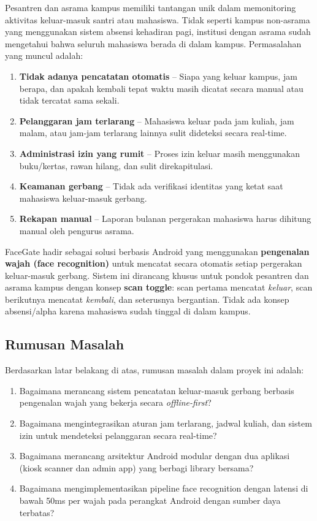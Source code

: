 \documentclass[12pt,a4paper]{article}
\newcommand{\appname}{FaceGate}
\begin{document}
Pesantren dan asrama kampus memiliki tantangan unik dalam memonitoring aktivitas keluar-masuk santri atau mahasiswa. Tidak seperti kampus non-asrama yang menggunakan sistem absensi kehadiran pagi, institusi dengan asrama sudah mengetahui bahwa seluruh mahasiswa berada di dalam kampus. Permasalahan yang muncul adalah:

\begin{enumerate}[nolistsep]
  \item \textbf{Tidak adanya pencatatan otomatis} -- Siapa yang keluar kampus, jam berapa, dan apakah kembali tepat waktu masih dicatat secara manual atau tidak tercatat sama sekali.
  \item \textbf{Pelanggaran jam terlarang} -- Mahasiswa keluar pada jam kuliah, jam malam, atau jam-jam terlarang lainnya sulit dideteksi secara real-time.
  \item \textbf{Administrasi izin yang rumit} -- Proses izin keluar masih menggunakan buku/kertas, rawan hilang, dan sulit direkapitulasi.
  \item \textbf{Keamanan gerbang} -- Tidak ada verifikasi identitas yang ketat saat mahasiswa keluar-masuk gerbang.
  \item \textbf{Rekapan manual} -- Laporan bulanan pergerakan mahasiswa harus dihitung manual oleh pengurus asrama.
\end{enumerate}

\appname{} hadir sebagai solusi berbasis Android yang menggunakan \textbf{pengenalan wajah (face recognition)} untuk mencatat secara otomatis setiap pergerakan keluar-masuk gerbang. Sistem ini dirancang khusus untuk pondok pesantren dan asrama kampus dengan konsep \textbf{scan toggle}: scan pertama mencatat \textit{keluar}, scan berikutnya mencatat \textit{kembali}, dan seterusnya bergantian. Tidak ada konsep absensi/alpha karena mahasiswa sudah tinggal di dalam kampus.

\subsection{Rumusan Masalah}

Berdasarkan latar belakang di atas, rumusan masalah dalam proyek ini adalah:

\begin{enumerate}[nolistsep]
  \item Bagaimana merancang sistem pencatatan keluar-masuk gerbang berbasis pengenalan wajah yang bekerja secara \textit{offline-first}?
  \item Bagaimana mengintegrasikan aturan jam terlarang, jadwal kuliah, dan sistem izin untuk mendeteksi pelanggaran secara real-time?
  \item Bagaimana merancang arsitektur Android modular dengan dua aplikasi (kiosk scanner dan admin app) yang berbagi library bersama?
  \item Bagaimana mengimplementasikan pipeline face recognition dengan latensi di bawah 50ms per wajah pada perangkat Android dengan sumber daya terbatas?
\end{enumerate}
\end{document}
